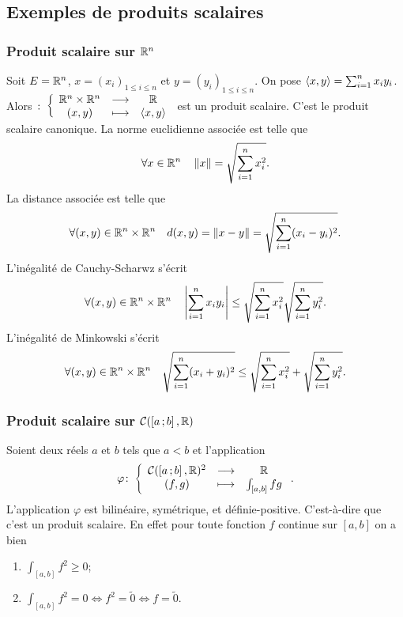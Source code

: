 \subsection{Exemples de produits scalaires}

\subsubsection{Produit scalaire sur $\mathbb{R}^n$}

Soit $E=\mathbb{R}^n$, $x=(x_i)_{1\le i\leq n}$ et $y=(y_i)_{1\le i\leq n}$. On pose $\left\langle{x},{y}\right\rangle=\sum_{i=1}^n x_iy_i$. Alors $\colon \left\{\begin{array}{ccc} \mathbb{R}^n\times\mathbb{R}^n & \longrightarrow &\mathbb{R}\\ (x,y) & \longmapsto & \left\langle{x},{y}\right\rangle \end{array} \right.$ est un produit scalaire. C'est le produit scalaire canonique. La norme euclidienne associée est telle que
\begin{equation}
  \forall x \in \mathbb{R}^n \quad \left\lVert x\right\rVert = \sqrt{\sum_{i=1}^n x_i^2}.
\end{equation}
La distance associée est telle que
\begin{equation}
  \forall (x,y) \in \mathbb{R}^n\times\mathbb{R}^n \quad d(x,y)=\left\lVert x-y\right\rVert = \sqrt{\sum_{i=1}^n (x_i-y_i)^2}.
\end{equation}
L'inégalité de Cauchy-Scharwz s'écrit
\begin{equation}
  \forall (x,y) \in \mathbb{R}^n\times\mathbb{R}^n \quad \left\lvert\sum_{i=1}^n x_iy_i\right\rvert \leq \sqrt{\sum_{i=1}^n x_i^2} \sqrt{\sum_{i=1}^n y_i^2}.
\end{equation}
L'inégalité de Minkowski s'écrit
\begin{equation}
  \forall (x,y) \in \mathbb{R}^n\times\mathbb{R}^n \quad \sqrt{\sum_{i=1}^n (x_i+y_i)^2} \leq \sqrt{\sum_{i=1}^n x_i^2}+ \sqrt{\sum_{i=1}^n y_i^2}.
\end{equation}

\subsubsection{Produit scalaire sur $\mathcal{C}(\left[ a \, ;  b \right],\mathbb{R})$}

Soient deux réels $a$ et $b$ tels que $a<b$ et l'application
\begin{equation}
  \varphi\colon \left\{\begin{array}{ccc} \mathcal{C}(\left[ a \, ;  b \right],\mathbb{R})^2 & \longrightarrow &\mathbb{R}\\ (f,g) & \longmapsto & \int_{[a,b]}fg \end{array} \right..
\end{equation}
L'application $\varphi$ est bilinéaire, symétrique, et définie-positive. C'est-à-dire que c'est un produit scalaire. En effet pour toute fonction $f$ continue sur $[a,b]$ on a bien
\begin{enumerate}
\item $\int_{[a,b]}f^2 \geq 0$;
\item $\int_{[a,b]}f^2 = 0 \iff f^2=\tilde{0} \iff f=\tilde{0}$.
\end{enumerate}


